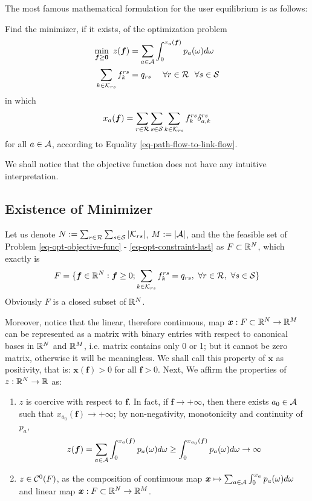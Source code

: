 \documentclass{article}
\begin{document}
The most famous mathematical formulation for the user equilibrium is as follows:

\begin{prob} \label{prob-min-formulation}
    Find the minimizer, if it exists, of the optimization problem
    \begin{align} \label{eq-opt-objective-func}
        \min_{\boldsymbol{f} \ge \boldsymbol{0}}~ z(\boldsymbol{f}) &= \sum_{a \in \mathcal{A}} \int_0^{x_a (\boldsymbol{f})} p_a (\omega) d \omega \\ 
        \sum_{k \in \mathcal{K}_{rs}} f_{k}^{rs} &= q_{rs} ~~~~ \forall r \in \mathcal{R} ~~ \forall s \in \mathcal{S} \label{eq-opt-constraint-last}
    \end{align}
    in which 
    $$ x_a (\boldsymbol{f}) = \sum_{r \in \mathcal{R}} \sum_{s \in \mathcal{S}} \sum_{k \in \mathcal{K}_{rs}} f_{k}^{rs} \delta_{a, k}^{rs} $$
    for all $ a \in \mathcal{A} $, according to Equality \ref{eq-path-flow-to-link-flow}.
\end{prob}

We shall notice that the objective function does not have any intuitive interpretation.

\subsection{Existence of Minimizer}
 
Let us denote $ N := \sum_{r \in \mathcal{R}} \sum_{s \in \mathcal{S}} \abs{\mathcal{K}_{rs}} $, $ M := \abs{\mathcal{A}} $, and the the feasible set of Problem \ref{eq-opt-objective-func} - \ref{eq-opt-constraint-last} as $ F \subset \mathbb{R}^N $, which exactly is
$$ F = \{ \boldsymbol{f} \in \mathbb{R}^N : \boldsymbol{f} \ge 0; \sum_{k \in \mathcal{K}_{rs}} f_{k}^{rs} = q_{rs}, ~\forall r \in \mathcal{R}, ~\forall s \in \mathcal{S} \} $$
Obviously $ F $ is a closed subset of $ \mathbb{R}^N $. 

Moreover, notice that the linear, therefore continuous, map $ \boldsymbol{x} : F \subset \mathbb{R}^N \rightarrow \mathbb{R}^M $ can be represented as a matrix with binary entries with respect to canonical bases in $ \mathbb{R}^N $ and $ \mathbb{R}^M $, i.e. matrix contains only 0 or 1; but it cannot be zero matrix, otherwise it will be meaningless. We shall call this property of $ \boldsymbol{x} $ as positivity, that is: $ \boldsymbol{x} (\boldsymbol{f}) > 0 $ for all $ \boldsymbol{f} > 0 $. Next, We affirm the properties of $ z : \mathbb{R}^N \rightarrow \mathbb{R} $ as:
\begin{enumerate}
    \item $ z $ is coercive with respect to $ \boldsymbol{f} $. In fact, if $ \boldsymbol{f} \rightarrow +\infty $, then there exists $ a_0 \in \mathcal{A} $ such that $ x_{a_0} (\boldsymbol{f}) \rightarrow + \infty $; by non-negativity, monotonicity and continuity of $ p_a $, 
    $$ z (\boldsymbol{f}) = \sum_{a \in \mathcal{A}} \int_0^{x_a (\boldsymbol{f})} p_a (\omega) d \omega \ge \int_0^{x_{a_0} (\boldsymbol{f})} p_a (\omega) d \omega \rightarrow \infty $$ 
    \item $ z \in \mathcal{C}^0 (F) $, as the composition of continuous map $ \boldsymbol{x} \mapsto \sum_{a \in \mathcal{A}} \int_0^{x_a} p_a (\omega) d \omega $ and linear map $ \boldsymbol{x} : F \subset \mathbb{R}^N \rightarrow \mathbb{R}^M $.
\end{enumerate}
\end{document}
